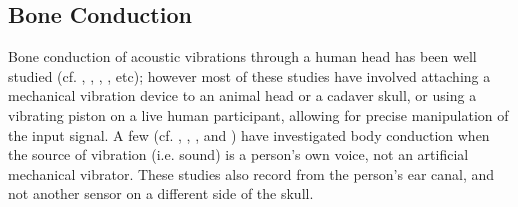 \documentclass[dissertation,copyright]{uathesis}
\begin{document}
\subsection{Bone Conduction}
Bone conduction of acoustic vibrations through a human head has been well studied (cf. \cite{allen:60}, \cite{hakansson:94}, \cite{stenfelt:00}, \cite{reinfeldt:10}, etc); however most of these studies have involved attaching a mechanical vibration device to an animal head or a cadaver skull, or using a vibrating piston on a live human participant, allowing for precise manipulation of the input signal.  
% 
%
A few (cf. \cite{bekesy:48}, \cite{hansen:97b}, \cite{porschmann:00}, and \cite{reinfeldt:10}) have investigated body conduction when the source of vibration (i.e. sound) is a person's own voice, not an artificial mechanical vibrator.  These studies also record from the person's ear canal, and not another sensor on a different side of the skull.
\end{document}
